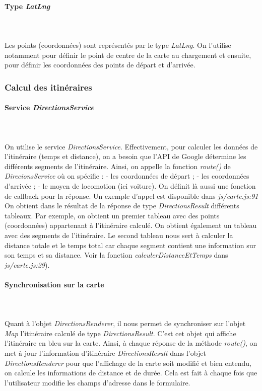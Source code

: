 \documentclass[a4paper]{article}
\begin{document}
\paragraph{Type \textit{LatLng}}
~~\\
\\
Les points (coordonnées) sont représentés par le type \textit{LatLng}.
On l'utilise notamment pour définir le point de centre de la carte
au chargement et ensuite, pour définir les coordonnées des points
de départ et d'arrivée.

\subsubsection{Calcul des itinéraires}

\paragraph{Service \textit{DirectionsService}}
~~\\
\\
On utilise le service \textit{DirectionsService}.
Effectivement, pour calculer les données de l'itinéraire (temps et distance), 
on a besoin que l'API de Google détermine les différents segments de 
l'itinéraire. Ainsi, on appelle la fonction \textit{route()} 
de \textit{DirecionsService} où on spécifie :
- les coordonnées de départ ;
- les coordonnées d'arrivée ;
- le moyen de locomotion (ici voiture).
On définit là aussi une fonction de callback pour la réponse.
Un exemple d'appel est disponible dans \textit{js/carte.js:91}
On obtient dans le résultat de la réponse de type \textit{DirectionsResult} 
différents tableaux. Par exemple, on obtient
un premier tableau avec des points (coordonnées) appartenant à l'itinéraire
calculé. On obtient également un tableau avec des segments de l'itinéraire.
Le second tableau nous sert à calculer la distance totale et le temps total
car chaque segment contient une information sur son temps et sa distance. 
Voir la fonction \textit{calculerDistanceEtTemps} dans \textit{js/carte.js:29}).

\paragraph{Synchronisation sur la carte}
~~\\
\\
Quant à l'objet \textit{DirectionsRenderer}, il nous permet de synchroniser sur l'objet
\textit{Map} l'itinéraire calculé de type \textit{DirectionsResult}. C'est cet objet
qui affiche l'itinéraire en bleu sur la carte.
Ainsi, à chaque réponse de la méthode \textit{route()}, on met à jour l'information
d'itinéraire \textit{DirectionsResult} dans l'objet \textit{DirectionsRenderer} pour que
l'affichage de la carte soit modifié et bien entendu, on calcule les informations
de distance et de durée. Cela est fait à chaque fois que l'utilisateur modifie
les champs d'adresse dans le formulaire. 
\end{document}
